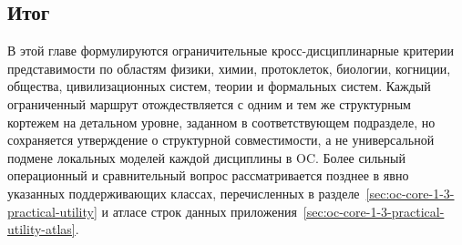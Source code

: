 \subsection*{Итог}

В этой главе формулируются ограничительные кросс-дисциплинарные критерии
представимости по областям физики, химии, протоклеток, биологии,
когниции, общества, цивилизационных систем, теории и формальных систем.
Каждый ограниченный маршрут отождествляется с одним и тем же структурным
кортежем на детальном уровне, заданном в соответствующем подразделе, но
сохраняется утверждение о структурной совместимости, а не универсальной
подмене локальных моделей каждой дисциплины в OC. Более сильный
операционный и сравнительный вопрос рассматривается позднее в явно указанных
поддерживающих классах, перечисленных
в разделе~\ref{sec:oc-core-1-3-practical-utility} и атласе строк данных
приложения~\ref{sec:oc-core-1-3-practical-utility-atlas}.

